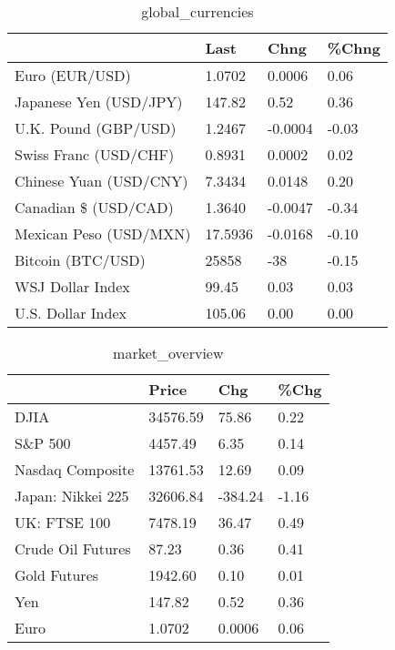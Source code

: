 \documentclass{article}%
\begin{document}
%


\begin{table}[htbp]%
\caption{global\_currencies}%
\centering%
\begin{adjustbox}{width=1\textwidth}%
\begin{tabular}{llll}
\toprule
                       &    Last &    Chng & \%Chng \\
\midrule
        Euro (EUR/USD) &  1.0702 &  0.0006 &  0.06 \\
Japanese Yen (USD/JPY) &  147.82 &    0.52 &  0.36 \\
  U.K. Pound (GBP/USD) &  1.2467 & -0.0004 & -0.03 \\
 Swiss Franc (USD/CHF) &  0.8931 &  0.0002 &  0.02 \\
Chinese Yuan (USD/CNY) &  7.3434 &  0.0148 &  0.20 \\
  Canadian \$ (USD/CAD) &  1.3640 & -0.0047 & -0.34 \\
Mexican Peso (USD/MXN) & 17.5936 & -0.0168 & -0.10 \\
     Bitcoin (BTC/USD) &   25858 &     -38 & -0.15 \\
      WSJ Dollar Index &   99.45 &    0.03 &  0.03 \\
     U.S. Dollar Index &  105.06 &    0.00 &  0.00 \\
\bottomrule
\end{tabular}
%
\end{adjustbox}%
\end{table}

%


\begin{table}[htbp]%
\caption{market\_overview}%
\centering%
\begin{adjustbox}{width=1\textwidth}%
\begin{tabular}{llll}
\toprule
                  &    Price &     Chg &  \%Chg \\
\midrule
             DJIA & 34576.59 &   75.86 &  0.22 \\
          S\&P 500 &  4457.49 &    6.35 &  0.14 \\
 Nasdaq Composite & 13761.53 &   12.69 &  0.09 \\
Japan: Nikkei 225 & 32606.84 & -384.24 & -1.16 \\
     UK: FTSE 100 &  7478.19 &   36.47 &  0.49 \\
Crude Oil Futures &    87.23 &    0.36 &  0.41 \\
     Gold Futures &  1942.60 &    0.10 &  0.01 \\
              Yen &   147.82 &    0.52 &  0.36 \\
             Euro &   1.0702 &  0.0006 &  0.06 \\
\bottomrule
\end{tabular}
%
\end{adjustbox}%
\end{table}

%
\end{document}
